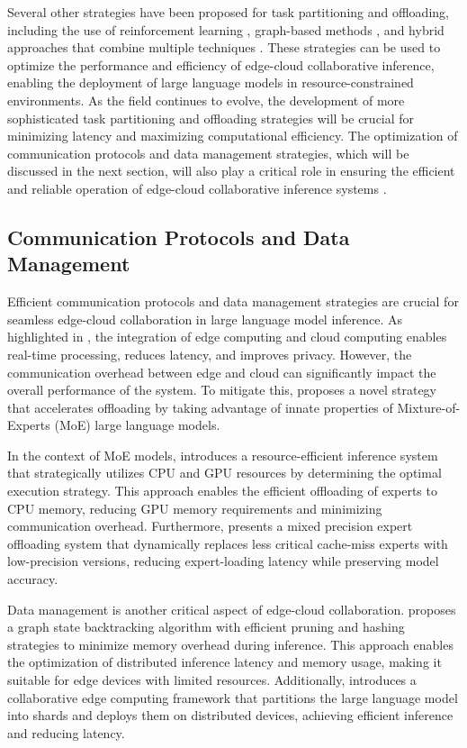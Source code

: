 \documentclass[11pt,a4paper]{article}
\begin{document}
Several other strategies have been proposed for task partitioning and offloading, including the use of reinforcement learning \cite{arxiv:2406.02616}, graph-based methods \cite{arxiv:2306.11695}, and hybrid approaches that combine multiple techniques \cite{arxiv:2405.14371}. These strategies can be used to optimize the performance and efficiency of edge-cloud collaborative inference, enabling the deployment of large language models in resource-constrained environments. As the field continues to evolve, the development of more sophisticated task partitioning and offloading strategies will be crucial for minimizing latency and maximizing computational efficiency. The optimization of communication protocols and data management strategies, which will be discussed in the next section, will also play a critical role in ensuring the efficient and reliable operation of edge-cloud collaborative inference systems \cite{doi:10.1609/aaai.v37i9.26255}.


\subsection{Communication Protocols and Data Management}


Efficient communication protocols and data management strategies are crucial for seamless edge-cloud collaboration in large language model inference. As highlighted in \cite{doi:10.1109/mnet.2025.3539338}, the integration of edge computing and cloud computing enables real-time processing, reduces latency, and improves privacy. However, the communication overhead between edge and cloud can significantly impact the overall performance of the system. To mitigate this, \cite{arxiv:2103.00768} proposes a novel strategy that accelerates offloading by taking advantage of innate properties of Mixture-of-Experts (MoE) large language models.

In the context of MoE models, \cite{arxiv:2402.07033} introduces a resource-efficient inference system that strategically utilizes CPU and GPU resources by determining the optimal execution strategy. This approach enables the efficient offloading of experts to CPU memory, reducing GPU memory requirements and minimizing communication overhead. Furthermore, \cite{arxiv:2411.01433} presents a mixed precision expert offloading system that dynamically replaces less critical cache-miss experts with low-precision versions, reducing expert-loading latency while preserving model accuracy.

Data management is another critical aspect of edge-cloud collaboration. \cite{doi:10.1145/3701997} proposes a graph state backtracking algorithm with efficient pruning and hashing strategies to minimize memory overhead during inference. This approach enables the optimization of distributed inference latency and memory usage, making it suitable for edge devices with limited resources. Additionally, \cite{arxiv:2405.14371} introduces a collaborative edge computing framework that partitions the large language model into shards and deploys them on distributed devices, achieving efficient inference and reducing latency.
\end{document}
